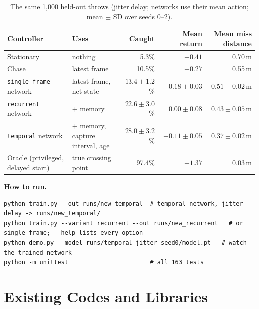 \documentclass[10pt,a4paper]{article}
\newcommand{\code}[1]{\texttt{#1}}
\begin{document}
\begin{table}[h]
  \centering\small
  \caption{The same 1{,}000 held-out throws (jitter delay; networks use their mean action; mean $\pm$ SD over seeds 0--2).}
  \label{tab:results}
  \begin{tabular}{@{}llrrr@{}}
    \toprule
    Controller & Uses & Caught & Mean return & Mean miss distance \\
    \midrule
    Stationary                       & nothing                          &  5.3\% & $-0.41$ & 0.70\,m \\
    Chase                           & latest frame                     & 10.5\% & $-0.27$ & 0.55\,m \\
    \code{single\_frame} network     & latest frame, net state          & $13.4\pm1.2$\% & $-0.18\pm0.03$ & $0.51\pm0.02$\,m \\
    \code{recurrent} network         & + memory                         & $22.6\pm3.0$\% & $0.00\pm0.08$ & $0.43\pm0.05$\,m \\
    \code{temporal} network          & + memory, capture interval, age  & $28.0\pm3.2$\% & $+0.11\pm0.05$ & $0.37\pm0.02$\,m \\
    Oracle (privileged, delayed start) & true crossing point            & 97.4\% & $+1.37$ & 0.03\,m \\
    \bottomrule
  \end{tabular}
\end{table}

\noindent\begin{minipage}{\textwidth}
\textbf{How to run.}
{\small
\begin{verbatim}
python train.py --out runs/new_temporal  # temporal network, jitter delay -> runs/new_temporal/
python train.py --variant recurrent --out runs/new_recurrent   # or single_frame; --help lists every option
python demo.py --model runs/temporal_jitter_seed0/model.pt   # watch the trained network
python -m unittest                       # all 163 tests
\end{verbatim}
}
\end{minipage}

\section{Existing Codes and Libraries}
\end{document}
